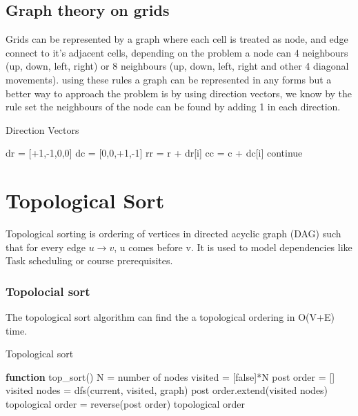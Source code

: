 \documentclass[12pt]{extarticle}
\begin{document}
\subsection{Graph theory on grids}
Grids can be represented by a graph where each cell is treated as node, and edge
connect to it's adjacent cells, depending on the problem a node can 4 neighbours 
(up, down, left, right) or 8 neighbours (up, down, left, right and other 4 diagonal
movements). using these rules a graph can be represented in any forms but a better 
way to approach the problem is by using direction vectors, we know by the rule set 
the neighbours of the node can be found by adding 1 in each direction. 

\begin{algorithm} [H]
    \caption{Direction Vectors}
    \begin{algorithmic}[1]
        \STATE dr = [+1,-1,0,0]
        \STATE dc = [0,0,+1,-1]
        \STATE rr = r + dr[i]
        \STATE cc = c + dc[i]
        \STATE continue
        \ENDIF
        \ENDFOR
    \end{algorithmic}
\end{algorithm}

\section{Topological Sort}
Topological sorting is ordering of vertices in directed acyclic graph (DAG) such that
for every edge $u \to v$, u comes before v. It is used to model dependencies like Task 
scheduling or course prerequisites.

\subsubsection*{Topolocial sort}
The topological sort algorithm can find the a topological ordering in O(V+E) time.

\begin{algorithm}[H]
    \caption{Topological sort}
    \begin{algorithmic}
    \STATE \textbf{function} top\_sort()
        \STATE N = number of nodes
        \STATE visited = [false]*N
        \STATE post order = []
        \STATE {}
        \STATE visited nodes = dfs(current, visited, graph) 
        \STATE post order.extend(visited nodes)
        \ENDIF
        \ENDFOR
        \STATE topological order = reverse(post order)
        \RETURN topological order
    \end{algorithmic}
\end{algorithm}
\end{document}

